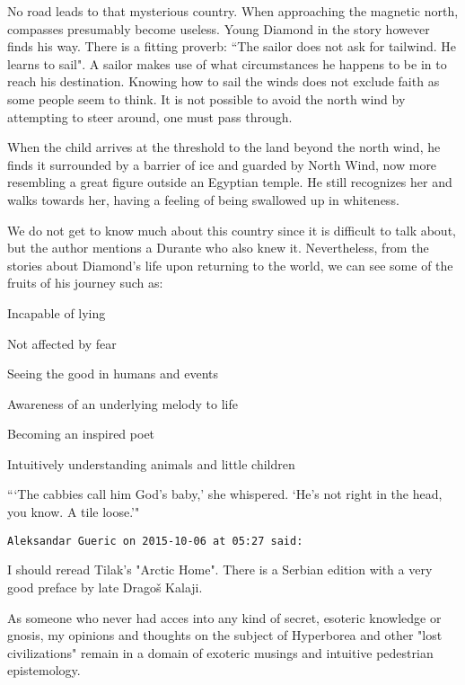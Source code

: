 \begin{footnotesize}
\begin{sffamily}
No road leads to that mysterious country. When approaching the magnetic north, compasses presumably become useless. Young Diamond in the story however finds his way. There is a fitting proverb: ``The sailor does not ask for tailwind. He learns to sail". A sailor makes use of what circumstances he happens to be in to reach his destination. Knowing how to sail the winds does not exclude faith as some people seem to think. It is not possible to avoid the north wind by attempting to steer around, one must pass through.

When the child arrives at the threshold to the land beyond the north wind, he finds it surrounded by a barrier of ice and guarded by North Wind, now more resembling a great figure outside an Egyptian temple. He still recognizes her and walks towards her, having a feeling of being swallowed up in whiteness.

We do not get to know much about this country since it is difficult to talk about, but the author mentions a Durante who also knew it. Nevertheless, from the stories about Diamond's life upon returning to the world, we can see some of the fruits of his journey such as:

Incapable of lying

Not affected by fear

Seeing the good in humans and events

Awareness of an underlying melody to life

Becoming an inspired poet

Intuitively understanding animals and little children

```The cabbies call him God's baby,' she whispered. `He's not right in the head, you know. A tile loose.'"


\hfill

\texttt{Aleksandar Gueric on 2015-10-06 at 05:27 said: }

I should reread Tilak's "Arctic Home". There is a Serbian edition with a very good preface by late Dragoš Kalaji.

As someone who never had acces into any kind of secret, esoteric knowledge or gnosis, my opinions and thoughts on the subject of Hyperborea and other "lost civilizations" remain in a domain of exoteric musings and intuitive pedestrian epistemology.


\end{sffamily}
\end{footnotesize}
